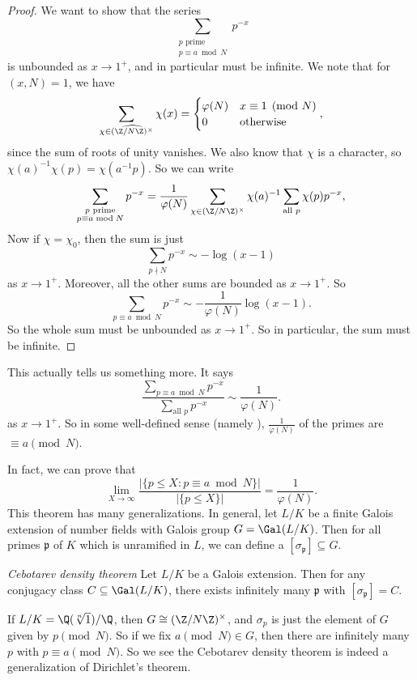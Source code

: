 \documentclass[a4paper]{article}
\begin{document}
\begin{proof}
  We want to show that the series
  \[
    \sum_{\substack{p\text{ prime}\\p\equiv a \bmod N}} p^{-x}
  \]
  is unbounded as $x \to 1^+$, and in particular must be infinite. We note that for $(x, N) = 1$, we have
  \[
    \sum_{\chi \in \widehat{(\Z/N\Z)^\times}} \chi(x) =
    \begin{cases}
      \varphi(N) & x \equiv 1 \pmod N\\
      0 & \text{otherwise}
    \end{cases},
  \]
  since the sum of roots of unity vanishes. We also know that $\chi$ is a character, so $\chi(a)^{-1}\chi(p) = \chi(a^{-1}p)$. So we can write
  \[
    \sum_{\substack{p\text{ prime}\\p\equiv a \bmod N}} p^{-x} = \frac{1}{\varphi(N)} \sum_{\chi \in (\Z/N\Z)^\times} \chi(a)^{-1}\sum_{\text{all }p} \chi(p) p^{-x},
  \]
  Now if $\chi = \chi_0$, then the sum is just
  \[
    \sum_{p \nmid N} p^{-x} \sim -\log(x - 1)
  \]
  as $x \to 1^+$. Moreover, all the other sums are bounded as $x \to 1^+$. So
  \[
    \sum_{p \equiv a \bmod N} p^{-x} \sim -\frac{1}{\varphi(N)} \log (x - 1).
  \]
  So the whole sum must be unbounded as $x \to 1^+$. So in particular, the sum must be infinite.
\end{proof}

This actually tells us something more. It says
\[
  \frac{\sum\limits_{p \equiv a \bmod N} p^{-x}}{\sum\limits_{\text{all }p} p^{-x}} \sim \frac{1}{\varphi(N)}.
\]
as $x \to 1^+$. So in some well-defined sense (namely ), $\frac{1}{\varphi(N)}$ of the primes are $\equiv a \pmod N$.

In fact, we can prove that
\[
  \lim_{X \to \infty} \frac{|\{p \leq X : p \equiv a \bmod N\}|}{|\{p \leq X\}|} = \frac{1}{\varphi(N)}.
\]
This theorem has many generalizations. In general, let $L/K$ be a finite Galois extension of number fields with Galois group $G = \Gal(L/K)$. Then for all primes $\mathfrak{p}$ of $K$ which is unramified in $L$, we can define a  $[\sigma_\mathfrak{p}] \subseteq G$.

\begin{thm}\emph{Cebotarev density theorem}
  Let $L/K$ be a Galois extension. Then for any conjugacy class $C \subseteq \Gal(L/K)$, there exists infinitely many $\mathfrak{p}$ with $[\sigma_\mathfrak{p}] = C$.
\end{thm}
If $L/K = \Q(\sqrt[n]{1})/\Q$, then $G \cong(\Z/N\Z)^\times$, and $\sigma_p$ is just the element of $G$ given by $p \pmod N$. So if we fix $a \pmod N \in G$, then there are infinitely many $p$ with $p \equiv a \pmod N$. So we see the Cebotarev density theorem is indeed a generalization of Dirichlet's theorem.
\end{document}
